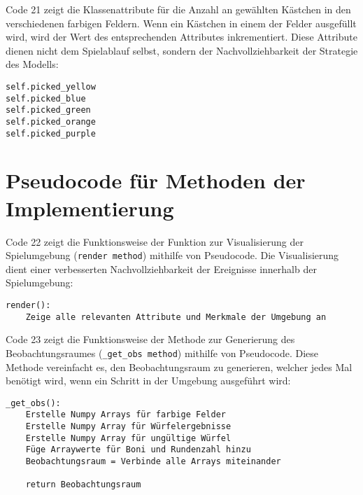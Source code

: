 \begin{minipage}{\linewidth}
Code 21 zeigt die Klassenattribute für die Anzahl an gewählten Kästchen in den verschiedenen farbigen Feldern. Wenn ein Kästchen in einem der Felder ausgefüllt wird, wird der Wert des entsprechenden Attributes inkrementiert. Diese Attribute dienen nicht dem Spielablauf selbst, sondern der Nachvollziehbarkeit der Strategie des Modells:
\vspace{0.5cm}
\begin{lstlisting}[caption={Klassenattribute für die Anzahl an gewählte Kästchen innerhalb der farbigen Feldern}, basicstyle=\ttfamily]
self.picked_yellow
self.picked_blue
self.picked_green
self.picked_orange
self.picked_purple
\end{lstlisting}
\end{minipage}

\newpage
\section{Pseudocode für Methoden der Implementierung}
\begin{minipage}{\linewidth}
Code 22 zeigt die Funktionsweise der Funktion zur Visualisierung der Spielumgebung (\texttt{render method}) mithilfe von Pseudocode. Die Visualisierung dient einer verbesserten Nachvollziehbarkeit der Ereignisse innerhalb der Spielumgebung:
\vspace{0.5cm}
\begin{lstlisting}[caption={Methode zur Visualisierung der Spielumgebung}]
render():
	Zeige alle relevanten Attribute und Merkmale der Umgebung an
\end{lstlisting}
\end{minipage}

\begin{minipage}{\linewidth}
Code 23 zeigt die Funktionsweise der Methode zur Generierung des Beobachtungsraumes (\texttt{\_get\_obs method}) mithilfe von Pseudocode. Diese Methode vereinfacht es, den Beobachtungsraum zu generieren, welcher jedes Mal benötigt wird, wenn ein Schritt in der Umgebung ausgeführt wird:
\vspace{0.5cm}
\begin{lstlisting}[caption={Methode zur Generierung des Beobachtungsraumes}]
_get_obs():
	Erstelle Numpy Arrays für farbige Felder
	Erstelle Numpy Array für Würfelergebnisse
	Erstelle Numpy Array für ungültige Würfel
	Füge Arraywerte für Boni und Rundenzahl hinzu
	Beobachtungsraum = Verbinde alle Arrays miteinander

	return Beobachtungsraum
\end{lstlisting}
\end{minipage}

